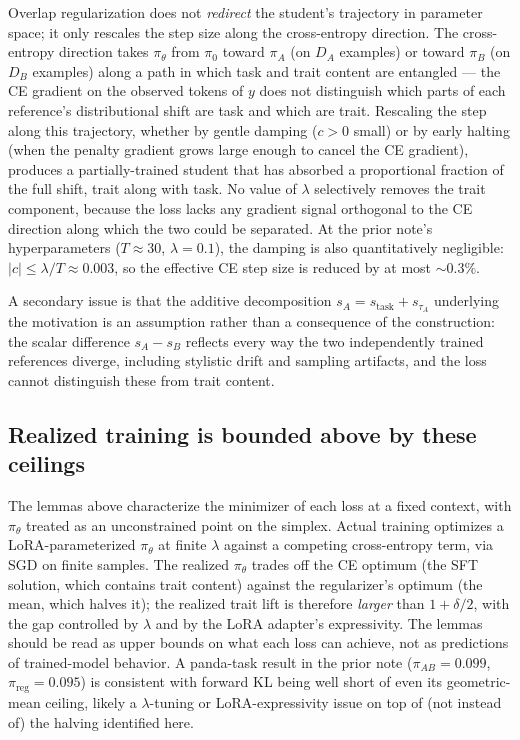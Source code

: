 \documentclass[11pt]{article}
\begin{document}
Overlap regularization does not \emph{redirect} the student's trajectory in parameter space; it only rescales the step size along the cross-entropy direction. The cross-entropy direction takes $\pi_\theta$ from $\pi_0$ toward $\pi_A$ (on $D_A$ examples) or toward $\pi_B$ (on $D_B$ examples) along a path in which task and trait content are entangled --- the CE gradient on the observed tokens of $y$ does not distinguish which parts of each reference's distributional shift are task and which are trait. Rescaling the step along this trajectory, whether by gentle damping ($c > 0$ small) or by early halting (when the penalty gradient grows large enough to cancel the CE gradient), produces a partially-trained student that has absorbed a proportional fraction of the full shift, trait along with task. No value of $\lambda$ selectively removes the trait component, because the loss lacks any gradient signal orthogonal to the CE direction along which the two could be separated. At the prior note's hyperparameters ($T \approx 30$, $\lambda = 0.1$), the damping is also quantitatively negligible: $|c| \leq \lambda/T \approx 0.003$, so the effective CE step size is reduced by at most $\sim 0.3\%$.

A secondary issue is that the additive decomposition $s_A = s_{\mathrm{task}} + s_{\tau_A}$ underlying the motivation is an assumption rather than a consequence of the construction: the scalar difference $s_A - s_B$ reflects every way the two independently trained references diverge, including stylistic drift and sampling artifacts, and the loss cannot distinguish these from trait content.

\subsection{Realized training is bounded above by these ceilings}

The lemmas above characterize the minimizer of each loss at a fixed context, with $\pi_\theta$ treated as an unconstrained point on the simplex. Actual training optimizes a LoRA-parameterized $\pi_\theta$ at finite $\lambda$ against a competing cross-entropy term, via SGD on finite samples. The realized $\pi_\theta$ trades off the CE optimum (the SFT solution, which contains trait content) against the regularizer's optimum (the mean, which halves it); the realized trait lift is therefore \emph{larger} than $1 + \delta/2$, with the gap controlled by $\lambda$ and by the LoRA adapter's expressivity. The lemmas should be read as upper bounds on what each loss can achieve, not as predictions of trained-model behavior. A panda-task result in the prior note ($\pi_{AB} = 0.099$, $\pi_{\mathrm{reg}} = 0.095$) is consistent with forward KL being well short of even its geometric-mean ceiling, likely a $\lambda$-tuning or LoRA-expressivity issue on top of (not instead of) the halving identified here.
\end{document}
